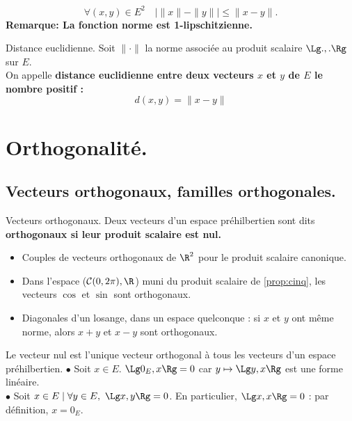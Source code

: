 \documentclass[11pt]{article}
\renewcommand*{\C}{\mathcal{C}}
\begin{document}
\begin{corr}{}{}
    \begin{equation*}
        \forall (x,y)\in E^2 \quad |\|x\|-\|y\||\leq\|x-y\|.
    \end{equation*}
    \bf{Remarque:} La fonction norme est 1-lipschitzienne.
\end{corr}

\begin{defi}{Distance euclidienne.}{}
    Soit $\|\cdot\|$ la norme associée au produit scalaire $\Lg.,.\Rg$ sur $E$.\\
    On appelle \bf{distance euclidienne} entre deux vecteurs $x$ et $y$ de $E$ le nombre positif :
    \begin{equation*}
        d(x,y)=\|x-y\|
    \end{equation*}
\end{defi}

\section{Orthogonalité.}
\subsection{Vecteurs orthogonaux, familles orthogonales.}

\begin{defi}{Vecteurs orthogonaux.}{}
    Deux vecteurs d'un espace préhilbertien sont dits \bf{orthogonaux} si leur produit scalaire est nul.
\end{defi}

\begin{ex}{}{}
    \begin{itemize}[topsep=0pt,itemsep=-0.9 ex]
        \item Couples de vecteurs orthogonaux de $\R^2$ pour le produit scalaire canonique.
        \item Dans l'espace ($\C(0,2\pi),\R$) muni du produit scalaire de \ref{prop:cinq}, les vecteurs $\cos$ et $\sin$ sont orthogonaux.
        \item Diagonales d'un losange, dans un espace quelconque : si $x$ et $y$ ont même norme, alors $x+y$ et $x-y$ sont orthogonaux.
    \end{itemize}
\end{ex}

\begin{prop}{}{}
    Le vecteur nul est l'unique vecteur orthogonal à tous les vecteurs d'un espace préhilbertien.
    \tcblower
    $\bullet$ Soit $x\in E$. $\Lg 0_E, x \Rg = 0$ car $y\mapsto \Lg y, x \Rg$ est une forme linéaire.\\
    $\bullet$ Soit $x\in E \mid \forall y \in E, ~ \Lg x, y \Rg = 0$. En particulier, $\Lg x, x \Rg = 0$ : par définition, $x=0_E$.
\end{prop}
\end{document}
